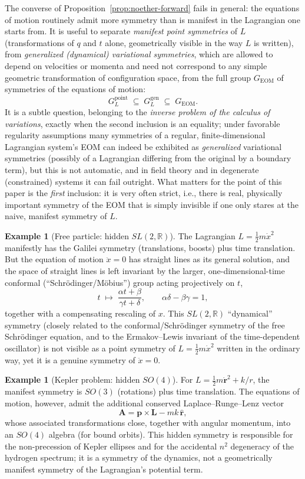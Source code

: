 \documentclass[11pt]{article}
\theoremstyle{definition}
\newtheorem{example}[theorem]{Example}
\theoremstyle{remark}
\newcommand{\Real}{\mathbb{R}}
\newcommand{\GEOM}{G_{\mathrm{EOM}}}
\begin{document}
The converse of Proposition~\ref{prop:noether-forward} fails in general: the equations of motion routinely admit more symmetry than is manifest in the Lagrangian one starts from. It is useful to separate \emph{manifest point symmetries} of $L$ (transformations of $q$ and $t$ alone, geometrically visible in the way $L$ is written), from \emph{generalized (dynamical) variational symmetries}, which are allowed to depend on velocities or momenta and need not correspond to any simple geometric transformation of configuration space, from the full group $\GEOM$ of symmetries of the equations of motion:
\[
G_L^{\text{point}} \;\subseteq\; G_L^{\text{gen}} \;\subseteq\; \GEOM .
\]
It is a subtle question, belonging to the \emph{inverse problem of the calculus of variations}, exactly when the second inclusion is an equality; under favorable regularity assumptions many symmetries of a regular, finite-dimensional Lagrangian system's EOM can indeed be exhibited as \emph{generalized} variational symmetries (possibly of a Lagrangian differing from the original by a boundary term), but this is not automatic, and in field theory and in degenerate (constrained) systems it can fail outright. What matters for the point of this paper is the \emph{first} inclusion: it is very often strict, i.e., there is real, physically important symmetry of the EOM that is simply invisible if one only stares at the naive, manifest symmetry of $L$.

\begin{example}[Free particle: hidden $SL(2,\Real)$]
The Lagrangian $L=\tfrac12 m\dot x^2$ manifestly has the Galilei symmetry (translations, boosts) plus time translation. But the equation of motion $\ddot x=0$ has straight lines as its general solution, and the space of straight lines is left invariant by the larger, one-dimensional-time conformal (``Schr\"odinger/M\"obius'') group acting projectively on $t$,
\[
t \;\longmapsto\; \frac{\alpha t+\beta}{\gamma t+\delta}, \qquad \alpha\delta-\beta\gamma=1,
\]
together with a compensating rescaling of $x$. This $SL(2,\Real)$ ``dynamical'' symmetry (closely related to the conformal/Schr\"odinger symmetry of the free Schr\"odinger equation, and to the Ermakov--Lewis invariant of the time-dependent oscillator) is not visible as a point symmetry of $L=\tfrac12 m\dot x^2$ written in the ordinary way, yet it is a genuine symmetry of $\ddot x=0$.
\end{example}

\begin{example}[Kepler problem: hidden $SO(4)$]
For $L = \tfrac12 m\dot{\bm r}^2 + k/r$, the manifest symmetry is $SO(3)$ (rotations) plus time translation. The equations of motion, however, admit the additional conserved Laplace--Runge--Lenz vector
\[
\bm A = \bm p \times \bm L - mk\,\hat{\bm r},
\]
whose associated transformations close, together with angular momentum, into an $SO(4)$ algebra (for bound orbits). This hidden symmetry is responsible for the non-precession of Kepler ellipses and for the accidental $n^2$ degeneracy of the hydrogen spectrum; it is a symmetry of the dynamics, not a geometrically manifest symmetry of the Lagrangian's potential term.
\end{example}
\end{document}
